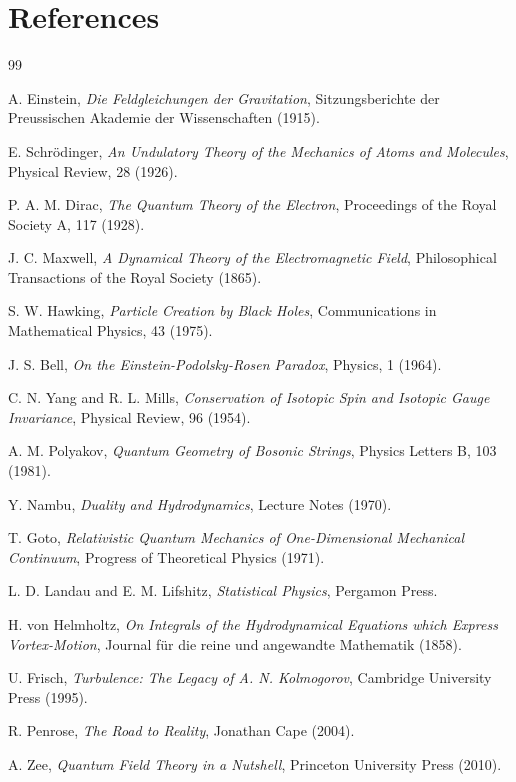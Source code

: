 \documentclass[11pt]{article}
\begin{document}
\section*{References}

\begin{thebibliography}{99}

A. Einstein,
\textit{Die Feldgleichungen der Gravitation},
Sitzungsberichte der Preussischen Akademie der Wissenschaften (1915).

E. Schrödinger,
\textit{An Undulatory Theory of the Mechanics of Atoms and Molecules},
Physical Review, 28 (1926).

P. A. M. Dirac,
\textit{The Quantum Theory of the Electron},
Proceedings of the Royal Society A, 117 (1928).

J. C. Maxwell,
\textit{A Dynamical Theory of the Electromagnetic Field},
Philosophical Transactions of the Royal Society (1865).

S. W. Hawking,
\textit{Particle Creation by Black Holes},
Communications in Mathematical Physics, 43 (1975).

J. S. Bell,
\textit{On the Einstein-Podolsky-Rosen Paradox},
Physics, 1 (1964).

C. N. Yang and R. L. Mills,
\textit{Conservation of Isotopic Spin and Isotopic Gauge Invariance},
Physical Review, 96 (1954).

A. M. Polyakov,
\textit{Quantum Geometry of Bosonic Strings},
Physics Letters B, 103 (1981).

Y. Nambu,
\textit{Duality and Hydrodynamics},
Lecture Notes (1970).

T. Goto,
\textit{Relativistic Quantum Mechanics of One-Dimensional Mechanical Continuum},
Progress of Theoretical Physics (1971).

L. D. Landau and E. M. Lifshitz,
\textit{Statistical Physics},
Pergamon Press.

H. von Helmholtz,
\textit{On Integrals of the Hydrodynamical Equations which Express Vortex-Motion},
Journal für die reine und angewandte Mathematik (1858).

U. Frisch,
\textit{Turbulence: The Legacy of A. N. Kolmogorov},
Cambridge University Press (1995).

R. Penrose,
\textit{The Road to Reality},
Jonathan Cape (2004).

A. Zee,
\textit{Quantum Field Theory in a Nutshell},
Princeton University Press (2010).

\end{thebibliography}
\end{document}
